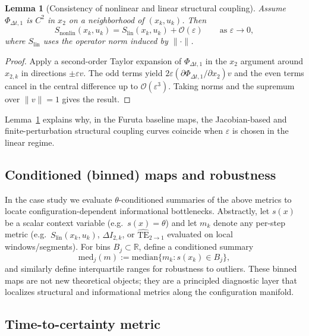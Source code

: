 \documentclass[final,5p,times,twocolumn]{elsarticle}
\newtheorem{lemma}{Lemma}
\begin{document}
\begin{lemma}[Consistency of nonlinear and linear structural coupling]
	\label{lem:S_consistency}
	Assume $\Phi_{\Delta t,1}$ is $C^2$ in $x_2$ on a neighborhood of $(x_k,u_k)$. Then
	\begin{equation}
		S_{\mathrm{nonlin}}(x_k,u_k) = S_{\mathrm{lin}}(x_k,u_k) + \mathcal{O}(\varepsilon)
		\qquad \text{as }\varepsilon\to 0,
	\end{equation}
	where $S_{\mathrm{lin}}$ uses the operator norm induced by $\|\cdot\|$.
\end{lemma}

\begin{proof}
	Apply a second-order Taylor expansion of $\Phi_{\Delta t,1}$ in the $x_2$ argument around $x_{2,k}$ in directions $\pm \varepsilon v$. The odd terms yield $2\varepsilon(\partial\Phi_{\Delta t,1}/\partial x_2)v$ and the even terms cancel in the central difference up to $\mathcal{O}(\varepsilon^3)$. Taking norms and the supremum over $\|v\|=1$ gives the result.
\end{proof}

Lemma~\ref{lem:S_consistency} explains why, in the Furuta baseline maps, the Jacobian-based and finite-perturbation structural coupling curves coincide when $\varepsilon$ is chosen in the linear regime.

\subsection{Conditioned (binned) maps and robustness}

In the case study we evaluate $\theta$-conditioned summaries of the above metrics to locate configuration-dependent informational bottlenecks. Abstractly, let $s(x)$ be a scalar context variable (e.g.\ $s(x)=\theta$) and let $m_k$ denote any per-step metric (e.g.\ $S_{\mathrm{lin}}(x_k,u_k)$, $\Delta I_{2,k}$, or $\widehat{\mathrm{TE}}_{2\to1}$ evaluated on local windows/segments). For bins $B_j\subset\mathbb{R}$, define a conditioned summary
\begin{equation}
	\mathrm{med}_j(m) := \mathrm{median}\{ m_k : s(x_k)\in B_j \},
\end{equation}
and similarly define interquartile ranges for robustness to outliers. These binned maps are not new theoretical objects; they are a principled diagnostic layer that localizes structural and informational metrics along the configuration manifold.

\subsection{Time-to-certainty metric}
\end{document}
